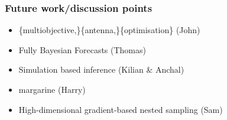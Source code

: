 \documentclass[aspectratio=169]{beamer}
\begin{document}
\begin{frame}
    \frametitle{Future work/discussion points}
    \begin{itemize}
        \item \{multiobjective,\}$ $\{antenna,\}\{optimisation\} (John)
        \item Fully Bayesian Forecasts (Thomas)
        \item Simulation based inference (Kilian \& Anchal)
        \item margarine (Harry)
        \item High-dimensional gradient-based nested sampling (Sam)
    \end{itemize}
\end{frame}
\end{document}
